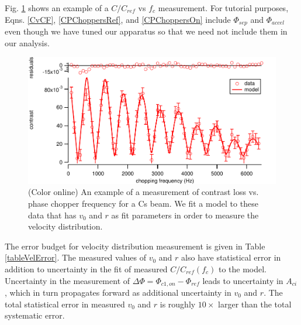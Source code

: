 \documentclass[twocolumn, prl,showpacs,superscriptaddress]{revtex4-1}   %
\newcommand{\figref}[1]{Fig. \ref{#1}}
\begin{document}
\figref{CvCFExample} shows an example of a $C/C_{ref}$ vs $f_c$ measurement. 
For tutorial purposes, Eqns. \eqref{CvCF}, \eqref{CPChoppersRef}, and \eqref{CPChoppersOn} include $\Phi_{sep}$ and $\Phi_{accel}$ even though we have tuned our apparatus so that we need not include them in our analysis.

\begin{figure}
\includegraphics[width=\linewidth,keepaspectratio]{CvCF_150420_o.pdf}
\caption{\label{CvCFExample}(Color online) An example of a measurement of contrast loss vs. phase chopper frequency for a Cs beam. We fit a model to these data that has $v_0$ and $r$ as fit parameters in order to measure the velocity distribution.}
\end{figure}
	
The error budget for velocity distribution measurement is given in Table \ref{tableVelError}. The measured values of $v_0$ and $r$ also have statistical error in addition to uncertainty in the fit of measured $C/C_{ref}(f_c)$ to the model. Uncertainty in the measurement of $\Delta\Phi = \Phi_{c1,on} - \Phi_{ref}$ leads to uncertainty in $A_{ci}$, which in turn propagates forward as additional uncertainty in $v_0$ and $r$. The total statistical error in measured $v_0$ and $r$ is roughly $10\times$ larger than the total systematic error.
\end{document}
